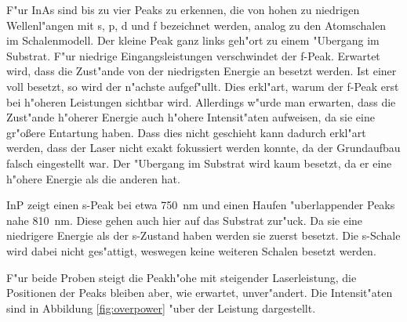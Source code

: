F"ur InAs sind bis zu vier Peaks zu erkennen, die von hohen zu niedrigen Wellenl"angen mit s, p, d und f bezeichnet werden, analog zu den Atomschalen im Schalenmodell.
Der kleine Peak ganz links geh"ort zu einem "Ubergang im Substrat.
F"ur niedrige Eingangsleistungen verschwindet der f-Peak.
Erwartet wird, dass die Zust"ande von der niedrigsten Energie an besetzt werden.
Ist einer voll besetzt, so wird der n"achste aufgef"ullt.
Dies erkl"art, warum der f-Peak erst bei h"oheren Leistungen sichtbar wird.
Allerdings w"urde man erwarten, dass die Zust"ande h"oherer Energie auch h"ohere Intensit"aten aufweisen, da sie eine gr"o{\ss}ere Entartung haben.
Dass dies nicht geschieht kann dadurch erkl"art werden, dass der Laser nicht exakt fokussiert werden konnte, da der Grundaufbau falsch eingestellt war.
Der "Ubergang im Substrat wird kaum besetzt, da er eine h"ohere Energie als die anderen hat.

InP zeigt einen s-Peak bei etwa \SI{750}{nm} und einen Haufen "uberlappender Peaks nahe \SI{810}{nm}.
Diese gehen auch hier auf das Substrat zur"uck.
Da sie eine niedrigere Energie als der s-Zustand haben werden sie zuerst besetzt.
Die s-Schale wird dabei nicht ges"attigt, weswegen keine weiteren Schalen besetzt werden.

F"ur beide Proben steigt die Peakh"ohe mit steigender Laserleistung, die Positionen der Peaks bleiben aber, wie erwartet, unver"andert.
Die Intensit"aten sind in Abbildung \vref{fig:overpower} "uber der Leistung dargestellt.